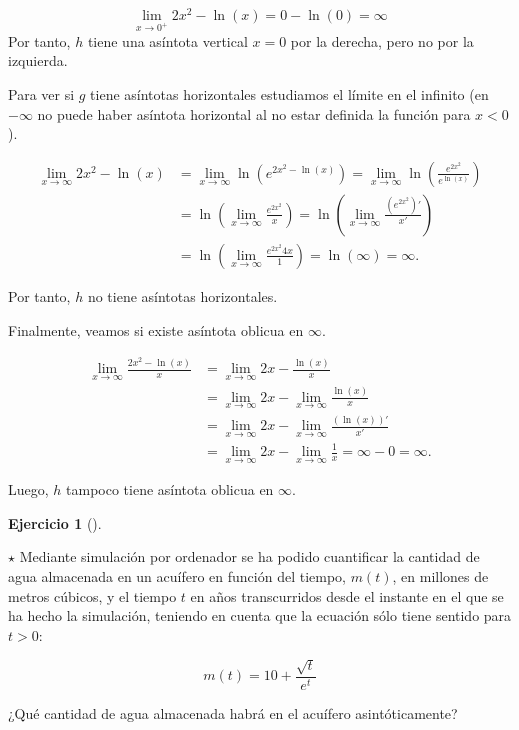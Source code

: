 \documentclass[
  a4paper,
]{scrreport}
\theoremstyle{definition}
\newtheorem{exercise}{Ejercicio}[chapter]
\theoremstyle{remark}
\begin{document}
\begin{tcolorbox}
\begin{enumerate}
  \[
   \lim_{x\to 0^+} 2x^2-\ln(x) = 0-\ln(0) = \infty
   \] Por tanto, \(h\) tiene una asíntota vertical \(x=0\) por la
  derecha, pero no por la izquierda.

  Para ver si \(g\) tiene asíntotas horizontales estudiamos el límite en
  el infinito (en \(-\infty\) no puede haber asíntota horizontal al no
  estar definida la función para \(x<0\)).

  \begin{align*}
   \lim_{x\to\infty} 2x^2-\ln(x) &= \lim_{x\to\infty}\ln(e^{2x^2-\ln(x)}) = \lim_{x\to \infty} \ln\left(\frac{e^{2x^2}}{e^{\ln(x)}}\right)\\ 
   &= \ln\left(\lim_{x\to \infty} \frac{e^{2x^2}}{x}\right) = \ln\left(\lim_{x\to \infty} \frac{(e^{2x^2})'}{x'}\right) \tag{L'Hôpital} \\ 
   &= \ln\left(\lim_{x\to \infty} \frac{e^{2x^2}4x}{1}\right) = \ln(\infty) = \infty.
   \end{align*}

  Por tanto, \(h\) no tiene asíntotas horizontales.

  Finalmente, veamos si existe asíntota oblicua en \(\infty\).

  \begin{align*}
   \lim_{x\to\infty} \frac{2x^2-\ln(x)}{x} &= \lim_{x\to \infty} 2x - \frac{\ln(x)}{x}\\ 
   & = \lim_{x\to \infty} 2x -\lim_{x\to \infty}\frac{\ln(x)}{x}\\ 
   &= \lim_{x\to \infty} 2x -\lim_{x\to \infty}\frac{(\ln(x))'}{x'} \tag{L'Hôpital}\\ 
   & = \lim_{x\to \infty} 2x -\lim_{x\to \infty}\frac{1}{x}= \infty-0=\infty.  
   \end{align*}

  Luego, \(h\) tampoco tiene asíntota oblicua en \(\infty\).
\end{enumerate}

\end{tcolorbox}

\begin{exercise}[]\protect\hypertarget{exr-acuifero}{}\label{exr-acuifero}

\(\star\) Mediante simulación por ordenador se ha podido cuantificar la
cantidad de agua almacenada en un acuífero en función del tiempo,
\(m(t)\), en millones de metros cúbicos, y el tiempo \(t\) en años
transcurridos desde el instante en el que se ha hecho la simulación,
teniendo en cuenta que la ecuación sólo tiene sentido para \(t>0\):

\[
m(t) = 10 + \frac{\sqrt{t}}{e^t}
\]

¿Qué cantidad de agua almacenada habrá en el acuífero asintóticamente?

\end{exercise}
\end{document}
